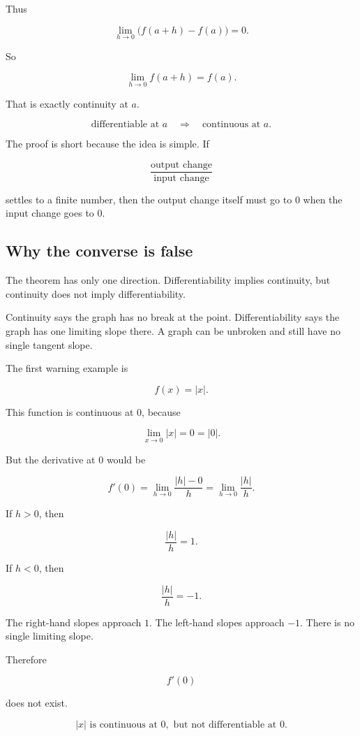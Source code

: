 Thus

\[
\lim_{h\to0}\bigl(f(a+h)-f(a)\bigr)=0.
\]

So

\[
\lim_{h\to0}f(a+h)=f(a).
\]

That is exactly continuity at \(a\).

\[
\boxed{
\text{differentiable at }a
\quad \Longrightarrow \quad
\text{continuous at }a.
}
\]

The proof is short because the idea is simple.  If

\[
\frac{\text{output change}}{\text{input change}}
\]

settles to a finite number, then the output change itself must go to \(0\) when the input change goes to \(0\).

\subsection{Why the converse is false}
\label{subsec:continuity-not-differentiability}

The theorem has only one direction.  Differentiability implies continuity, but continuity does not imply differentiability.

Continuity says the graph has no break at the point.  Differentiability says the graph has one limiting slope there.  A graph can be unbroken and still have no single tangent slope.

The first warning example is

\[
f(x)=|x|.
\]

This function is continuous at \(0\), because

\[
\lim_{x\to0}|x|=0=|0|.
\]

But the derivative at \(0\) would be

\[
f'(0)=\lim_{h\to0}\frac{|h|-0}{h}
=
\lim_{h\to0}\frac{|h|}{h}.
\]

If \(h>0\), then

\[
\frac{|h|}{h}=1.
\]

If \(h<0\), then

\[
\frac{|h|}{h}=-1.
\]

The right-hand slopes approach \(1\).  The left-hand slopes approach \(-1\).  There is no single limiting slope.

Therefore

\[
f'(0)
\]

does not exist.

\[
\boxed{
|x|\text{ is continuous at }0,\text{ but not differentiable at }0.
}
\]

